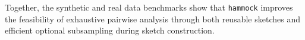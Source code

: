 \documentclass[11pt]{article}
\newcommand{\program}[1]{\texttt{#1}}
\begin{document}
Together, the synthetic and real data benchmarks show that \program{hammock} improves the feasibility of exhaustive pairwise analysis through both reusable sketches and efficient optional subsampling during sketch construction.

\end{document}
